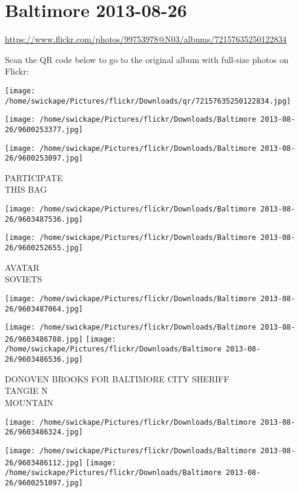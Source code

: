 \documentclass[10pt,letterpaper]{article}
\title{}
\author{}
\date{}
\begin{document}
\section*{Baltimore 2013-08-26}

\url{https://www.flickr.com/photos/99753978@N03/albums/72157635250122834}

Scan the QR code below to go to the original album with full-size photos on Flickr:

\texttt{[image: /home/swickape/Pictures/flickr/Downloads/qr/72157635250122834.jpg]}
\pagebreak

\texttt{[image: /home/swickape/Pictures/flickr/Downloads/Baltimore 2013-08-26/9600253377.jpg]}

\vspace{0.25in}
\texttt{[image: /home/swickape/Pictures/flickr/Downloads/Baltimore 2013-08-26/9600253097.jpg]}

PARTICIPATE\\
THIS BAG
\pagebreak

\texttt{[image: /home/swickape/Pictures/flickr/Downloads/Baltimore 2013-08-26/9603487536.jpg]}

\vspace{0.25in}
\texttt{[image: /home/swickape/Pictures/flickr/Downloads/Baltimore 2013-08-26/9600252655.jpg]}

AVATAR\\
SOVIETS
\pagebreak

\texttt{[image: /home/swickape/Pictures/flickr/Downloads/Baltimore 2013-08-26/9603487064.jpg]}

\vspace{0.25in}
\texttt{[image: /home/swickape/Pictures/flickr/Downloads/Baltimore 2013-08-26/9603486788.jpg]}
\texttt{[image: /home/swickape/Pictures/flickr/Downloads/Baltimore 2013-08-26/9603486536.jpg]}

DONOVEN BROOKS FOR BALTIMORE CITY SHERIFF\\
TANGIE N\\
MOUNTAIN
\pagebreak

\texttt{[image: /home/swickape/Pictures/flickr/Downloads/Baltimore 2013-08-26/9603486324.jpg]}

\vspace{0.25in}
\texttt{[image: /home/swickape/Pictures/flickr/Downloads/Baltimore 2013-08-26/9603486112.jpg]}
\texttt{[image: /home/swickape/Pictures/flickr/Downloads/Baltimore 2013-08-26/9600251097.jpg]}
\end{document}
